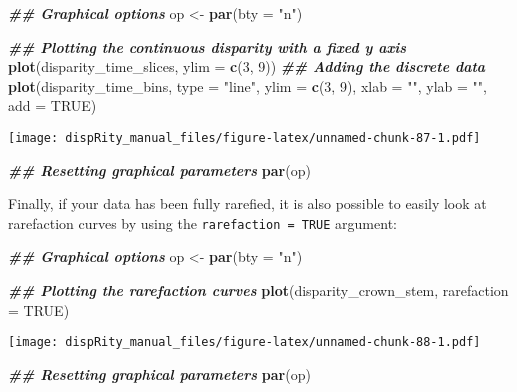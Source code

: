 \documentclass[
]{book}
\newenvironment{Shaded}{\begin{snugshade}}{\end{snugshade}}
\newcommand{\AttributeTok}[1]{\textcolor[rgb]{0.13,0.29,0.53}{#1}}
\newcommand{\ConstantTok}[1]{\textcolor[rgb]{0.56,0.35,0.01}{#1}}
\newcommand{\DecValTok}[1]{\textcolor[rgb]{0.00,0.00,0.81}{#1}}
\newcommand{\DocumentationTok}[1]{\textcolor[rgb]{0.56,0.35,0.01}{\textbf{\textit{#1}}}}
\newcommand{\FunctionTok}[1]{\textcolor[rgb]{0.13,0.29,0.53}{\textbf{#1}}}
\newcommand{\NormalTok}[1]{#1}
\newcommand{\OtherTok}[1]{\textcolor[rgb]{0.56,0.35,0.01}{#1}}
\newcommand{\StringTok}[1]{\textcolor[rgb]{0.31,0.60,0.02}{#1}}
\begin{document}
\begin{Shaded}
\begin{Highlighting}[]
\DocumentationTok{\#\# Graphical options}
\NormalTok{op }\OtherTok{\textless{}{-}} \FunctionTok{par}\NormalTok{(}\AttributeTok{bty =} \StringTok{"n"}\NormalTok{)}

\DocumentationTok{\#\# Plotting the continuous disparity with a fixed y axis}
\FunctionTok{plot}\NormalTok{(disparity\_time\_slices, }\AttributeTok{ylim =} \FunctionTok{c}\NormalTok{(}\DecValTok{3}\NormalTok{, }\DecValTok{9}\NormalTok{))}
\DocumentationTok{\#\# Adding the discrete data}
\FunctionTok{plot}\NormalTok{(disparity\_time\_bins, }\AttributeTok{type =} \StringTok{"line"}\NormalTok{, }\AttributeTok{ylim =} \FunctionTok{c}\NormalTok{(}\DecValTok{3}\NormalTok{, }\DecValTok{9}\NormalTok{),}
     \AttributeTok{xlab =} \StringTok{""}\NormalTok{, }\AttributeTok{ylab =} \StringTok{""}\NormalTok{, }\AttributeTok{add =} \ConstantTok{TRUE}\NormalTok{)}
\end{Highlighting}
\end{Shaded}

\texttt{[image: dispRity\_manual\_files/figure-latex/unnamed-chunk-87-1.pdf]}

\begin{Shaded}
\begin{Highlighting}[]
\DocumentationTok{\#\# Resetting graphical parameters}
\FunctionTok{par}\NormalTok{(op)}
\end{Highlighting}
\end{Shaded}

Finally, if your data has been fully rarefied, it is also possible to easily look at rarefaction curves by using the \texttt{rarefaction\ =\ TRUE} argument:

\begin{Shaded}
\begin{Highlighting}[]
\DocumentationTok{\#\# Graphical options}
\NormalTok{op }\OtherTok{\textless{}{-}} \FunctionTok{par}\NormalTok{(}\AttributeTok{bty =} \StringTok{"n"}\NormalTok{)}

\DocumentationTok{\#\# Plotting the rarefaction curves}
\FunctionTok{plot}\NormalTok{(disparity\_crown\_stem, }\AttributeTok{rarefaction =} \ConstantTok{TRUE}\NormalTok{)}
\end{Highlighting}
\end{Shaded}

\texttt{[image: dispRity\_manual\_files/figure-latex/unnamed-chunk-88-1.pdf]}

\begin{Shaded}
\begin{Highlighting}[]
\DocumentationTok{\#\# Resetting graphical parameters}
\FunctionTok{par}\NormalTok{(op)}
\end{Highlighting}
\end{Shaded}
\end{document}

